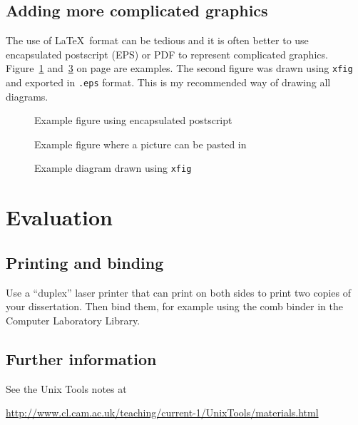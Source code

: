 \documentclass[a4paper,12pt,twoside,openright]{report}
\begin{document}
	
	
	\section{Adding more complicated graphics}
	
	The use of \LaTeX\ format can be tedious and it is often better to use
	encapsulated postscript (EPS) or PDF to represent complicated graphics.
	Figure~\ref{epsfig} and~\ref{xfig} on page \pageref{xfig} are
	examples. The second figure was drawn using \texttt{xfig} and exported in
	{\tt.eps} format. This is my recommended way of drawing all diagrams.
	
	
	\begin{figure}[tbh]
		\caption{Example figure using encapsulated postscript}
		\label{epsfig}
	\end{figure}
	
	\begin{figure}[tbh]
		\vspace{4in}
		\caption{Example figure where a picture can be pasted in}
		\label{pastedfig}
	\end{figure}
	
	
	\begin{figure}[tbh]
		\caption{Example diagram drawn using \texttt{xfig}}
		\label{xfig}
	\end{figure}
	
	
	\chapter{Evaluation}
	
	\section{Printing and binding}
	
	Use a ``duplex'' laser printer that can print on both sides to print
	two copies of your dissertation. Then bind them, for example using the
	comb binder in the Computer Laboratory Library.
	
	\section{Further information}
	
	See the Unix Tools notes at
	
	\url{http://www.cl.cam.ac.uk/teaching/current-1/UnixTools/materials.html}
	
\end{document}
